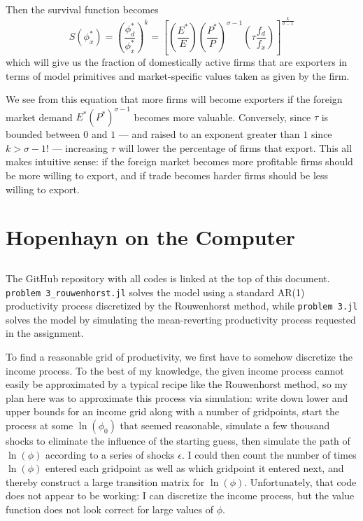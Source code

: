 \documentclass[12pt, letterpaper]{article}
\begin{document}
	Then the survival function becomes
	\[ S(\phi_x^*) = \left(\frac{\phi_d^*}{\phi_x^*}\right)^k = \left[ \left(\frac{E^*}{E}\right) \left(\frac{P^*}{P}\right)^{\sigma - 1} \left( \tau \frac{f_d}{f_x} \right) \right]^{\frac{k}{\sigma - 1}} \]
	which will give us the fraction of domestically active firms that are exporters in terms of model primitives and market-specific values taken as given by the firm.
	
	We see from this equation that more firms will become exporters if the foreign market demand \(E^* \left(P^*\right)^{\sigma - 1}\) becomes more valuable. Conversely, since \(\tau\) is bounded between \(0\) and \(1\) --- and raised to an exponent greater than \(1\) since \(k > \sigma - 1\)! --- increasing \(\tau\) will lower the percentage of firms that export. This all makes intuitive sense: if the foreign market becomes more profitable firms should be more willing to export, and if trade becomes harder firms should be less willing to export.

    \section{Hopenhayn on the Computer}

    \subsection{}

	The GitHub repository with all codes is linked at the top of this document.\\ \verb|problem 3_rouwenhorst.jl| solves the model using a standard AR(1) productivity process discretized by the Rouwenhorst method, while \verb|problem 3.jl| solves the model by simulating the mean-reverting productivity process requested in the assignment.

	To find a reasonable grid of productivity, we first have to somehow discretize the income process. To the best of my knowledge, the given income process cannot easily be approximated by a typical recipe like the Rouwenhorst method, so my plan here was to approximate this process via simulation: write down lower and upper bounds for an income grid along with a number of gridpoints, start the process at some \(\ln(\phi_0)\) that seemed reasonable, simulate a few thousand shocks to eliminate the influence of the starting guess, then simulate the path of \(\ln(\phi)\) according to a series of shocks \(\epsilon\). I could then count the number of times \(\ln(\phi)\) entered each gridpoint as well as which gridpoint it entered next, and thereby construct a large transition matrix for \(\ln(\phi)\). Unfortunately, that code does not appear to be working: I can discretize the income process, but the value function does not look correct for large values of \(\phi\). 
	
\end{document}
